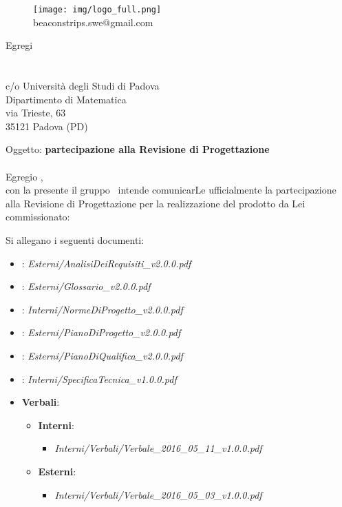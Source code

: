 \documentclass[a4paper]{article}
\newcommand{\spazio}{\vspace{1.5cm}}
\begin{document}
\spazio
\begin{figure}[!h]
	\centering
	\texttt{[image: img/logo\_full.png]} \\
	beaconstrips.swe@gmail.com
\end{figure}

\spazio

\begin{flushright}
\date{2016-06-10}
Egregi \\
\COMMITTENTE \\
\CARDIN \\
c/o Università degli Studi di Padova  \\
Dipartimento di Matematica \\
via Trieste, 63 \\
35121 Padova (PD)
\end{flushright}
\spazio

Oggetto: \textbf{partecipazione alla Revisione di Progettazione} \\ \\
Egregio \COMMITTENTE,\\
con la presente il gruppo \AUTORE \ intende comunicarLe ufficialmente la partecipazione alla Revisione di Progettazione per la realizzazione del prodotto da Lei commissionato: \\

Si allegano i seguenti documenti:
\begin{itemize}
	\item \textbf{\ARdocRP}: \textit{Esterni/AnalisiDeiRequisiti\_v2.0.0.pdf}
	\item \textbf{\GldocRP}: \textit{Esterni/Glossario\_v2.0.0.pdf}
	\item \textbf{\NPdocRP}: \textit{Interni/NormeDiProgetto\_v2.0.0.pdf}
	\item \textbf{\PPdocRP}: \textit{Esterni/PianoDiProgetto\_v2.0.0.pdf}
	\item \textbf{\PQdocRP}: \textit{Esterni/PianoDiQualifica\_v2.0.0.pdf}
	\item \textbf{\SFdocRP}: \textit{Interni/SpecificaTecnica\_v1.0.0.pdf}
	\item \textbf{Verbali}:
		\begin{itemize}
			\item \textbf{Interni}:
				\begin{itemize}
					\item \textit{Interni/Verbali/Verbale\_2016\_05\_11\_v1.0.0.pdf}
				\end{itemize}
			\item \textbf{Esterni}:
				\begin{itemize}
					\item \textit{Interni/Verbali/Verbale\_2016\_05\_03\_v1.0.0.pdf}
				\end{itemize}
		\end{itemize}
	\end{itemize}
\spazio
\end{document}
